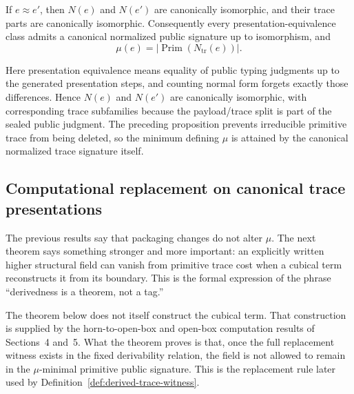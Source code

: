 \documentclass{lmcs}
\begin{document}
\begin{prop}
If \(e\approx e'\), then \(N(e)\) and \(N(e')\) are canonically isomorphic, and their trace
parts are canonically isomorphic.  Consequently every presentation-equivalence class admits a
canonical normalized public signature up to isomorphism, and
\[
  \mu(e)=\left|\operatorname{Prim}(N_{\mathrm{tr}}(e))\right|.
\]
\end{prop}

Here presentation equivalence means equality of public typing judgments up to the generated
presentation steps, and counting normal form forgets exactly those differences.  Hence
\(N(e)\) and \(N(e')\) are canonically isomorphic, with corresponding trace subfamilies because
the payload/trace split is part of the sealed public judgment.  The preceding proposition prevents
irreducible primitive trace from being deleted, so the minimum defining \(\mu\) is attained by
the canonical normalized trace signature itself.

\subsection{Computational replacement on canonical trace presentations}

The previous results say that packaging changes do not alter \(\mu\).  The next theorem says
something stronger and more important: an explicitly written higher structural field can
vanish from primitive trace cost when a cubical term reconstructs it from its boundary.
This is the formal expression of the phrase ``derivedness is a theorem, not a tag.''

The theorem below does not itself construct the cubical term.  That construction is supplied
by the horn-to-open-box and open-box computation results of Sections~4 and~5.  What the
theorem proves is that, once the full replacement witness exists in the fixed derivability
relation, the field is not allowed to remain in the \(\mu\)-minimal primitive public
signature.  This is the replacement rule later used by
Definition~\ref{def:derived-trace-witness}.
\end{document}
